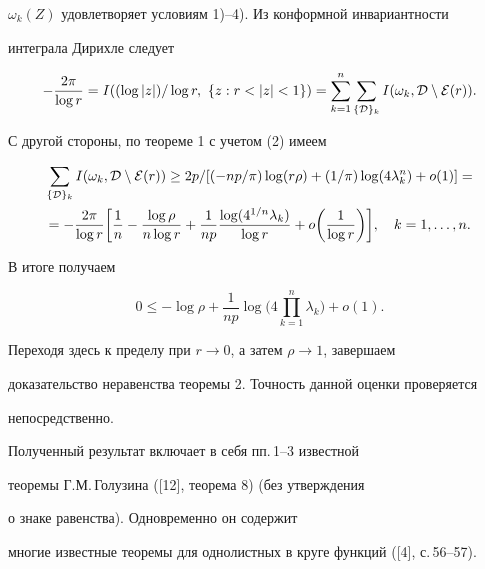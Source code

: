\begin{pf}
$\omega_k(Z)$ удовлетворяет условиям 1)--4). Из конформной инвариантности


интеграла Дирихле следует


$$


-\frac{2\pi}{\log r}= I((\log |z|)/ \log r,\ \{z:


r<|z|<1\})=\sum\limits_{k=1}^{n}\sum_{\{{\cal D}\}_k}I(\omega_k,{\cal


D}\setminus {\cal E}(r)).


$$


С другой стороны, по теореме 1 с учетом (2) имеем


\begin{multline*}


\sum_{\{{\cal D}\}_k}I(\omega_k,{\cal D}\setminus{\cal E}(r))\geq


2p/[(-np/\pi)\log (r\rho)+(1/\pi)\log(4\lambda_k^n)+o(1)]= \\


%


=-\frac{2\pi}{\log r}\bigg[\frac{1}{n}-\frac{\log\rho}{n\log r}+


\frac{1}{np}\frac{\log(4^{1/n}\lambda_k)}{\log r}+


o\bigg(\frac{1}{\log r}\bigg)\bigg],\quad k=1,\dotsc, n.


\end{multline*}


В итоге получаем


$$


0\leq -\log\rho+


\frac{1}{np}\log\bigg(4\prod_{k=1}^{n}\lambda_k\bigg)+o(1).


$$


Переходя здесь к пределу при $r\to 0$, а затем $\rho\to 1$, завершаем


доказательство неравенства теоремы 2. Точность данной оценки проверяется


непосредственно.


\end{pf}





Полученный результат включает в себя пп.\,1--3 известной


теоремы Г.М.\,Голузина ([12], теорема 8) (без утверждения


о знаке равенства). Одновременно он содержит


многие известные теоремы для однолистных в круге функций ([4], с.\,56--57).


